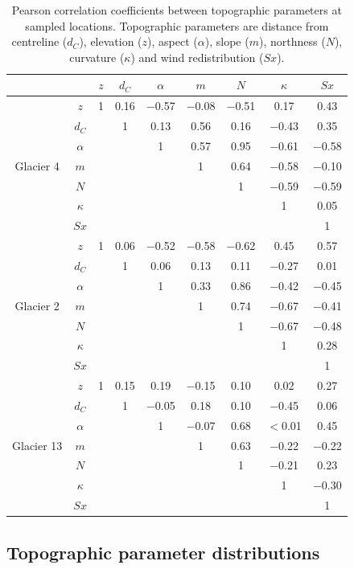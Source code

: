 \documentclass{sfuthesis}
\newcommand{\params}{Topographic parameters are distance from centreline ($d_C$), elevation ($z$), aspect ($\alpha$), slope ($m$), northness ($N$), curvature ($\kappa$) and wind redistribution ($Sx$). }
\begin{document}
\begin{table}[H]
\centering
\caption{Pearson correlation coefficients between topographic parameters at sampled locations. \params}
\label{tab:pearson_correlation}
\begin{tabular}{cc|ccccccc}
 &  & $z$ & $d_C$ & $\alpha$ & $m$ & $N$ & $\kappa$ & $Sx$ \\ \hline
\multirow{7}{*}{Glacier 4} & $z$ & 1 & 0.16 & $-$0.57 & $-$0.08 & $-$0.51 & 0.17 & 0.43 \\
 & $d_C$ &  & 1 & 0.13 & 0.56 & 0.16 & $-$0.43 & 0.35 \\
 & $\alpha$ &   &  & 1 & 0.57 & 0.95 & $-$0.61 & $-$0.58 \\
 & $m$ &   &   &   & 1 & 0.64 & $-$0.58 & $-$0.10 \\
 & $N$ &   &   &   &   & 1 & $-$0.59 & $-$0.59 \\
 & $\kappa$ &   &   &   &   &   & 1 & 0.05 \\
 & $Sx$ &   &   &   &   &   &   & 1 \\ \hline
\multirow{7}{*}{Glacier 2} & $z$ & 1 & 0.06 & $-$0.52 & $-$0.58 & $-$0.62 & 0.45 & 0.57 \\
 & $d_C$ &   & 1 & 0.06 & 0.13 & 0.11 & $-$0.27 & 0.01 \\
 & $\alpha$ &   &  & 1 & 0.33 & 0.86 & $-$0.42 & $-$0.45 \\
 & $m$ &   &   &   & 1 & 0.74 & $-$0.67 & $-$0.41 \\
 & $N$ &   &   &   &   & 1 & $-$0.67 & $-$0.48 \\
 & $\kappa$ & &   &   &   &   & 1 & 0.28 \\
 & $Sx$ &   &   &   &   &   &   & 1 \\ \hline
\multirow{7}{*}{Glacier 13} & $z$ & 1 & 0.15 & 0.19 & $-$0.15 & 0.10 & 0.02 & 0.27 \\
 & $d_C$ &   & 1 & $-$0.05 & 0.18 & 0.10 & $-$0.45 & 0.06 \\
 & $\alpha$ &   &   & 1 & $-$0.07 & 0.68 & $<$0.01 & 0.45 \\
 & $m$ &   &   &   & 1 & 0.63 & $-$0.22 & $-$0.22 \\
 & $N$ &   &   &   &   & 1 & $-$0.21 & 0.23 \\
 & $\kappa$ &   &   &   &   &   & 1 & $-$0.30 \\
 & $Sx$ &   &   &   &   &   &   & 1
\end{tabular}
\end{table}


\subsection{Topographic parameter distributions}
\end{document}

